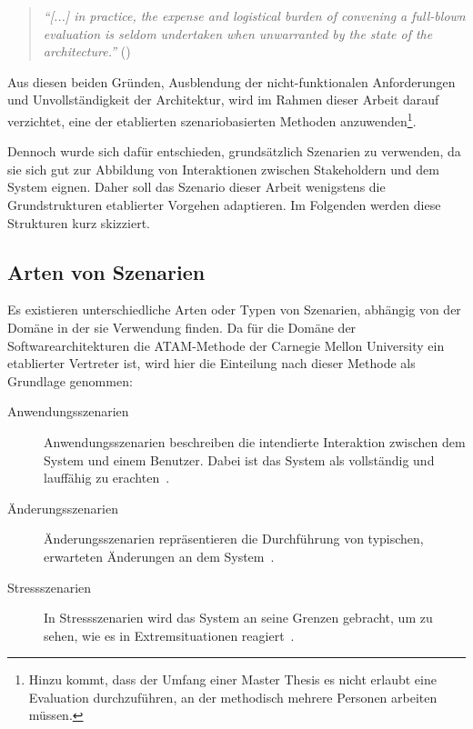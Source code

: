   \begin{quote}
    \emph{"`[...] in practice, the expense and logistical burden of convening a full-blown evaluation is seldom undertaken when unwarranted by the state of the architecture."'} (\citep[S. 24]{evaluating_software_architectures})
  \end{quote}
  
  Aus diesen beiden Gründen, Ausblendung der nicht-funktionalen Anforderungen und Unvollständigkeit der Architektur, wird im Rahmen dieser Arbeit darauf verzichtet, eine der etablierten szenariobasierten Methoden anzuwenden\footnote{Hinzu kommt, dass der Umfang einer Master Thesis es nicht erlaubt eine Evaluation durchzuführen, an der methodisch mehrere Personen arbeiten müssen.}.
  
  Dennoch wurde sich dafür entschieden, grundsätzlich Szenarien zu verwenden, da sie sich gut zur Abbildung von Interaktionen zwischen Stakeholdern und dem System eignen. Daher soll das Szenario dieser Arbeit wenigstens die Grundstrukturen etablierter Vorgehen adaptieren. Im Folgenden werden diese Strukturen kurz skizziert.
  
\subsection{Arten von Szenarien} %
\label{sub:arten_von_szenarien}

  Es existieren unterschiedliche Arten oder Typen von Szenarien, abhängig von der Domäne in der sie Verwendung finden. Da für die Domäne der Softwarearchitekturen die ATAM-Methode der Carnegie Mellon University ein etablierter Vertreter ist, wird hier die Einteilung nach dieser Methode als Grundlage genommen:
  
  \begin{description}
    \item[Anwendungsszenarien] Anwendungsszenarien beschreiben die intendierte Interaktion zwischen dem System und einem Benutzer. Dabei ist das System als vollständig und lauffähig zu erachten~\cite[S. 14]{kazman2000ama}.
    \item[Änderungsszenarien] Änderungsszenarien repräsentieren die Durchführung von typischen, erwarteten Änderungen an dem System~\cite[S. 14f]{kazman2000ama}.
    \item[Stressszenarien] In Stressszenarien wird das System an seine Grenzen gebracht, um zu sehen, wie es in Extremsituationen reagiert~\cite[S. 15]{kazman2000ama}.
  \end{description}
  
